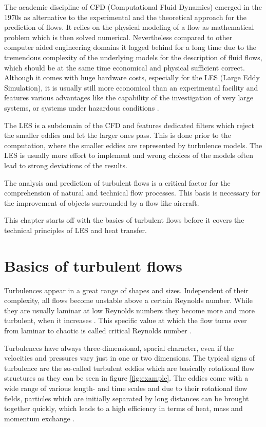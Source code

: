 The academic discipline of CFD (Computational Fluid Dynamics) emerged in the 1970s as alternative to the experimental and the theoretical approach for the prediction of flows. It relies on the physical modeling of a flow as mathematical problem which is then solved numerical. Nevertheless compared to other computer aided engineering domains it lagged behind for a long time due to the tremendous complexity of the underlying models for the description of fluid flows, which should be at the same time economical and physical sufficient correct. Although it comes with huge hardware costs, especially for the LES (Large Eddy Simulation), it is usually still more economical than an experimental facility and features various advantages like the capability of the investigation of very large systems, or systems under hazardous conditions \cite{versteeg}.

The LES is a subdomain of the CFD and features dedicated filters which reject the smaller eddies and let the larger ones pass. This is done prior to the computation, where the smaller eddies are represented by turbulence models. The LES is usually more effort to implement and wrong choices of the models often lead to strong deviations of the results.

The analysis and prediction of turbulent flows is a critical factor for the comprehension of natural and technical flow processes. This basis is necessary for the improvement of objects surrounded by a flow like aircraft.

This chapter starts off with the basics of turbulent flows before it covers the technical principles of LES and heat transfer.

\section{Basics of turbulent flows}
Turbulences appear in a great range of shapes and sizes. Independent of their complexity, all flows become unstable above a certain Reynolds number. While they are usually laminar at low Reynolds numbers they become more and more turbulent, when it increases \cite{hassler}. This specific value at which the flow turns over from laminar to chaotic is called critical Reynolds number \cite{versteeg}.

Turbulences have always three-dimensional, spacial character, even if the velocities and pressures vary just in one or two dimensions. The typical signs of turbulence are the so-called turbulent eddies which are basically rotational flow structures as they can be seen in figure \ref{fig:example}. The eddies come with a wide range of various length- and time scales and due to their rotational flow fields, particles which are initially separated by long distances can be brought together quickly, which leads to a high efficiency in terms of heat, mass and momentum exchange \cite{versteeg}.

